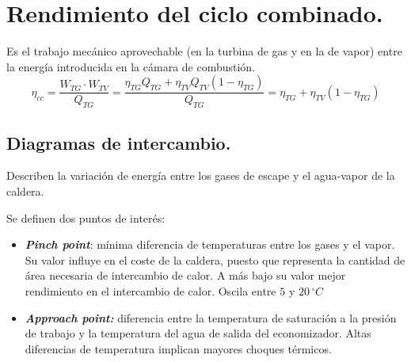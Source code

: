 	\section{Rendimiento del ciclo combinado.}
		Es el trabajo mecánico aprovechable (en la turbina de gas y en la de vapor) entre la energía introducida en la cámara de combustión.
		\[\eta_{cc} = \dfrac{W_{TG} \cdot W_{TV}}{Q_{TG}} = \dfrac{\eta_{TG} Q_{TG} + \eta_{TV} Q_{TV}(1-\eta_{TG})}{Q_{TG}} = \eta_{TG} + \eta_{TV}(1-\eta_{TG})\]
		
		\subsection{Diagramas de intercambio.}
			Describen la variación de energía entre los gases de escape y el agua-vapor de la caldera.
			
			
			Se definen dos puntos de interés:
			\begin{itemize}
				\item \textbf{\textit{Pinch point}}: mínima diferencia de temperaturas entre los gases y el vapor. Su valor influye en el coste de la caldera, puesto que representa la cantidad de área necesaria de intercambio de calor. A más bajo su valor mejor rendimiento en el intercambio de calor. Oscila entre $5$ y $20\,^\circ C$
				
				\item \textbf{\textit{Approach point:}} diferencia entre la temperatura de saturación a la presión de trabajo y la temperatura del agua de salida del economizador. Altas diferencias de temperatura implican mayores choques térmicos.
			\end{itemize}
			

